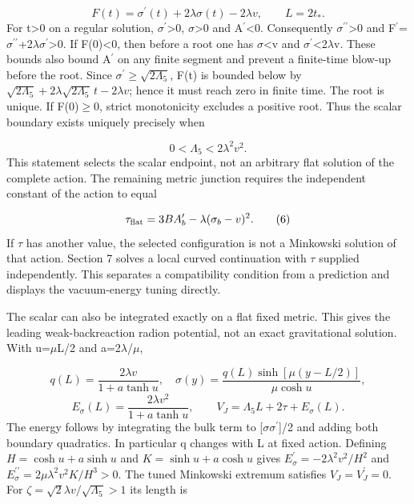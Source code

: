 \documentclass[11pt,a4paper]{article}
\begin{document}
\begin{equation}
F(t)=\sigma^\prime(t)+2\lambda\sigma(t)-2\lambda v,\qquad L=2t_* .\tag{4}
\end{equation}
For t>0 on a regular solution, \ensuremath{\sigma}\ensuremath{{}^{\prime}}>0, \ensuremath{\sigma}>0 and A\ensuremath{{}^{\prime}}<0. Consequently \ensuremath{\sigma}\ensuremath{{}^{\prime\prime}}>0 and F\ensuremath{{}^{\prime}}=\ensuremath{\sigma}\ensuremath{{}^{\prime\prime}}+2\ensuremath{\lambda}\ensuremath{\sigma}\ensuremath{{}^{\prime}}>0. If F(0)<0, then before a root one has \ensuremath{\sigma}<v and \ensuremath{\sigma}\ensuremath{{}^{\prime}}<2\ensuremath{\lambda}v. These bounds also bound A\ensuremath{{}^{\prime}} on any finite segment and prevent a finite-time blow-up before the root. Since \ensuremath{\sigma^{\prime}\geq\sqrt{2\Lambda_5}}, F(t) is bounded below by \ensuremath{\sqrt{2\Lambda_5}+2\lambda\sqrt{2\Lambda_5}\,t-2\lambda v}; hence it must reach zero in finite time. The root is unique. If F(0)\ensuremath{\geq}0, strict monotonicity excludes a positive root. Thus the scalar boundary exists uniquely precisely when

\begin{equation}
0<\Lambda_5<2\lambda^2v^2.\tag{5}
\end{equation}
This statement selects the scalar endpoint, not an arbitrary flat solution of the complete action. The remaining metric junction requires the independent constant of the action to equal

\begin{equation}
\tau_{\rm flat}=3B A_b^\prime-\lambda(\sigma_b-v)^2.\tag{6}
\end{equation}
If \ensuremath{\tau} has another value, the selected configuration is not a Minkowski solution of that action. Section 7 solves a local curved continuation with \ensuremath{\tau} supplied independently. This separates a compatibility condition from a prediction and displays the vacuum-energy tuning directly.

The scalar can also be integrated exactly on a flat fixed metric. This gives the leading weak-backreaction radion potential, not an exact gravitational solution. With u=\ensuremath{\mu}L/2 and a=2\ensuremath{\lambda}/\ensuremath{\mu},

\begin{equation}
q(L)=\frac{2\lambda v}{1+a\tanh u},\quad \sigma(y)=\frac{q(L)\sinh[\mu(y-L/2)]}{\mu\cosh u},\tag{7a}
\end{equation}
\begin{equation}
E_\sigma(L)=\frac{2\lambda v^2}{1+a\tanh u},\qquad V_J=\Lambda_5L+2\tau+E_\sigma(L).\tag{7b}
\end{equation}
The energy follows by integrating the bulk term to [\ensuremath{\sigma}\ensuremath{\sigma}\ensuremath{{}^{\prime}}]/2 and adding both boundary quadratics. In particular q changes with L at fixed action. Defining \ensuremath{H=\cosh u+a\sinh u} and \ensuremath{K=\sinh u+a\cosh u} gives \ensuremath{E_\sigma^{\prime}=-2\lambda^2v^2/H^2} and \ensuremath{E_\sigma^{\prime\prime}=2\mu\lambda^2v^2K/H^3>0}. The tuned Minkowski extremum satisfies \ensuremath{V_J=V_J^{\prime}=0}. For \ensuremath{\zeta=\sqrt{2}\lambda v/\sqrt{\Lambda_5}>1} its length is
\end{document}

